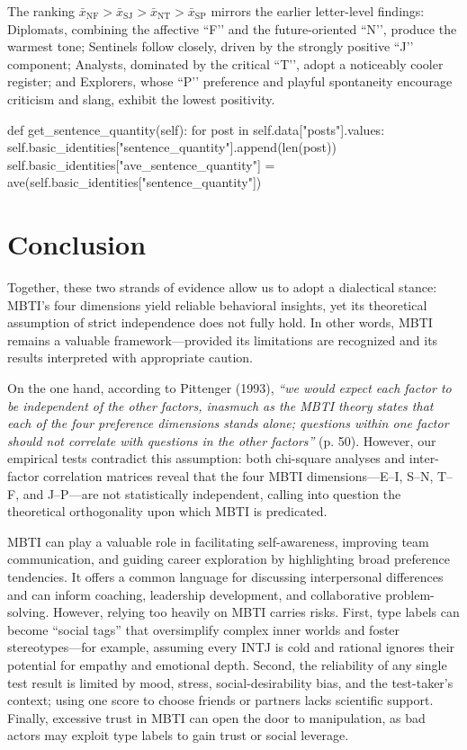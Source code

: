 \documentclass[12pt]{article}
\numberwithin{figure}{section}  %
\begin{document}
	The ranking $\bar{x}_{\text{NF}}>\bar{x}_{\text{SJ}}>\bar{x}_{\text{NT}}>\bar{x}_{\text{SP}}$ mirrors the earlier letter-level findings: Diplomats, combining the affective “F’’ and the future-oriented “N’’, produce the warmest tone; Sentinels follow closely, driven by the strongly positive “J’’ component; Analysts, dominated by the critical “T’’, adopt a noticeably cooler register; and Explorers, whose “P’’ preference and playful spontaneity encourage criticism and slang, exhibit the lowest positivity. 
	


	
	

	\begin{python}
def get_sentence_quantity(self):
    for post in self.data["posts"].values:
        self.basic_identities["sentence_quantity"].append(len(post))
    self.basic_identities["ave_sentence_quantity"] = ave(self.basic_identities["sentence_quantity"])
	\end{python}
	
\section{Conclusion}	
Together, these two strands of evidence allow us to adopt a dialectical stance: 
MBTI’s four dimensions yield reliable behavioral insights, yet its theoretical assumption of strict independence does not fully hold. 
In other words, MBTI remains a valuable framework—provided its limitations are recognized and its results interpreted with appropriate caution.

On the one hand, according to Pittenger (1993), \textit{“we would expect each factor to be independent of the other factors, inasmuch as the MBTI theory states that each of the four preference dimensions stands alone;
 questions within one factor should not correlate with questions in the other factors” }(p. 50). However, our empirical tests contradict this assumption: both chi-square analyses and inter-factor correlation matrices reveal that the four MBTI dimensions—E–I, S–N, T–F, and J–P—are not statistically independent, calling into question the theoretical orthogonality upon which MBTI is predicated.

MBTI can play a valuable role in facilitating self-awareness, improving team communication, and guiding career exploration by highlighting broad preference tendencies. It offers a common language for discussing interpersonal differences and can inform coaching, leadership development, and collaborative problem-solving. However, relying too heavily on MBTI carries risks. First, type labels can become “social tags” that oversimplify complex inner worlds and foster stereotypes—for example, assuming every INTJ is cold and rational ignores their potential for empathy and emotional depth. Second, the reliability of any single test result is limited by mood, stress, social-desirability bias, and the test-taker’s context; using one score to choose friends or partners lacks scientific support. Finally, excessive trust in MBTI can open the door to manipulation, as bad actors may exploit type labels to gain trust or social leverage.
\end{document}
